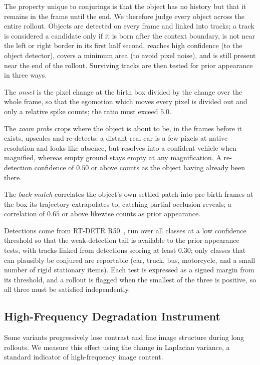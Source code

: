 The property unique to conjurings is that the object has no history but that it remains in the frame until the end. We therefore judge every object across the entire rollout.
Objects are detected on every frame and linked into tracks; a track is considered a candidate
only if it is born after the context boundary, is not near the left or right border in its
first half second, reaches high confidence (to the object detector), covers a minimum area (to avoid pixel noise), and is still present near
the end of the rollout. Surviving tracks are then tested for prior appearance in three ways.

The \emph{onset} is the pixel change at the birth box divided by the change over the whole
frame, so that the egomotion which moves every pixel is divided out and only a relative spike
counts; the ratio must exceed $5.0$.

The \emph{zoom probe} crops where the object is about to be, in the frames before it exists,
upscales and re-detects: a distant real car is a few pixels at native resolution and looks like
absence, but resolves into a confident vehicle when magnified, whereas empty ground stays empty
at any magnification. A re-detection confidence of $0.50$ or above counts as the object having
already been there.

The \emph{back-match} correlates the object's own settled patch into pre-birth frames at the box
its trajectory extrapolates to, catching partial occlusion reveals; a correlation of $0.65$ or
above likewise counts as prior appearance.

Detections come from RT-DETR R50~\cite{zhao2024detrs}, run over all classes at a low confidence
threshold so that the weak-detection tail is available to the prior-appearance tests, with
tracks linked from detections scoring at least $0.30$; only classes that can plausibly be
conjured are reportable (car, truck, bus, motorcycle, and a small number of rigid stationary
items). Each test is expressed as a signed margin from its threshold, and a rollout is flagged
when the smallest of the three is positive, so all three must be satisfied independently.


\subsection{High-Frequency Degradation Instrument}
\label{app:high_frequency_metric}

Some variants progressively lose contrast and fine image structure during
long rollouts. We measure this effect using the change in Laplacian variance,
a standard indicator of high-frequency image content.

